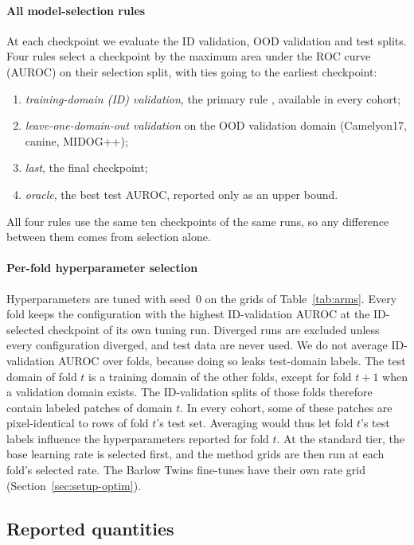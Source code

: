 \paragraph{All model-selection rules} At each checkpoint we evaluate the ID
validation, OOD validation and test splits. Four rules select a checkpoint by
the maximum area under the ROC curve (AUROC) on their selection split, with ties
going to the earliest checkpoint:
\begin{enumerate}
  \item \emph{training-domain (ID) validation}, the primary rule
    \citep[DomainBed's default;][]{gulrajani2021domainbed}, available in every
    cohort;
  \item \emph{leave-one-domain-out validation} on the OOD validation domain
    (Camelyon17, canine, MIDOG++);
  \item \emph{last}, the final checkpoint;
  \item \emph{oracle}, the best test AUROC, reported only as an upper bound.
\end{enumerate}
All four rules use the same ten checkpoints of the same runs, so any
difference between them comes from selection alone.

\paragraph{Per-fold hyperparameter selection} Hyperparameters are tuned with
seed~0 on the grids of Table~\ref{tab:arms}. Every fold keeps the configuration
with the highest ID-validation AUROC at the ID-selected checkpoint of its own
tuning run. Diverged runs are excluded unless every configuration diverged, and
test data are never used. We do not average ID-validation AUROC over folds,
because doing so leaks test-domain labels. The test domain of fold $t$ is a
training domain of the other folds, except for fold $t+1$ when a validation
domain exists. The ID-validation splits of those folds therefore contain
labeled patches of domain $t$. In every cohort, some of these patches are
pixel-identical to rows of fold $t$'s test set.
Averaging would thus let fold $t$'s test labels influence the hyperparameters
reported for fold $t$. At the standard tier, the base learning rate is selected
first, and the method grids are then run at each fold's selected rate. The
Barlow Twins fine-tunes have their own rate grid (Section~\ref{sec:setup-optim}).

\subsection{Reported quantities}
\label{sec:protocol-metrics}

